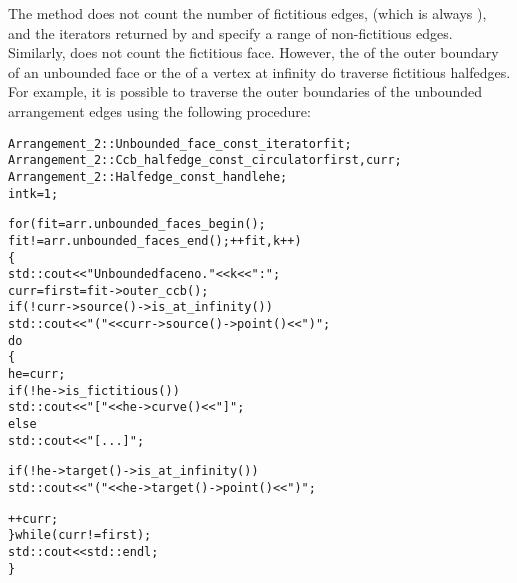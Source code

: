 \begin{ccAdvanced}
The method  does not count the number of
fictitious edges, (which is always
), and the iterators
returned by  and  specify
a range of non-fictitious edges. Similarly, 
does not count the fictitious face. However, the
 of the outer boundary of an
unbounded face or the  of a vertex
at infinity do traverse fictitious halfedges. For example, it is possible
to traverse the outer boundaries of the unbounded arrangement edges
using the following procedure:
\begin{alltt}
  Arrangement_2::Unbounded_face_const_iterator  fit;
  Arrangement_2::Ccb_halfedge_const_circulator  first, curr;
  Arrangement_2::Halfedge_const_handle          he;
  int                                           k = 1;

  for (fit = arr.unbounded_faces_begin();
       fit != arr.unbounded_faces_end(); ++fit, k++)
  \{
    std::cout << "Unbounded face no. " << k << ": ";
    curr = first = fit->outer_ccb();
    if (! curr->source()->is_at_infinity())
      std::cout << "(" << curr->source()->point() << ")";
    do
    \{
      he = curr;
      if (! he->is_fictitious())
        std::cout << "   [" << he->curve() << "]   ";
      else
        std::cout << "   [ ... ]   ";

      if (! he->target()->is_at_infinity())
        std::cout << "(" << he->target()->point() << ")";

      ++curr;
    \} while (curr != first);
    std::cout << std::endl;
  \}
\end{alltt}

\end{ccAdvanced}
